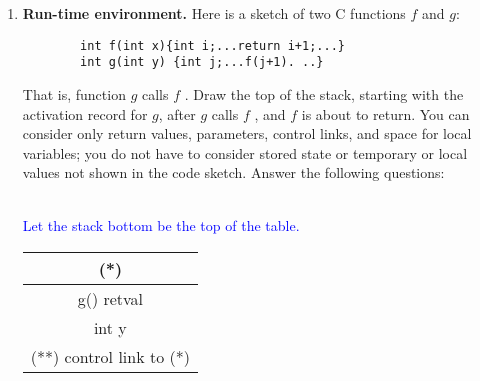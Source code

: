 \documentclass[10pt]{article}
\begin{document}
\begin{enumerate}
  \item \textbf{Run-time environment. } Here is a sketch of two C functions $f$ and $g$:
        \begin{verbatim}
        int f(int x){int i;...return i+1;...}
        int g(int y) {int j;...f(j+1). ..}
    \end{verbatim}
        That is, function $g$ calls $f$ . Draw the top of the stack, starting with the activation record for $g$,
        after $g$ calls $f$ , and $f$ is about to return. You can consider
        only return values, parameters, control links, and space for local variables; you
        do not have to consider stored state or temporary or local values not shown in
        the code sketch. Answer the following questions:
        \textcolor{blue}{\\
          Let the stack bottom be the top of the table.\\
          \begin{tabular}{|c|}
            \hline
            \hline
            (*)                        \\
            \hline
            g() retval                 \\
            \hline
            int y                      \\
            \hline
            (**) control link to (*)   \\

\end{tabular}}
\end{enumerate}
\end{document}
